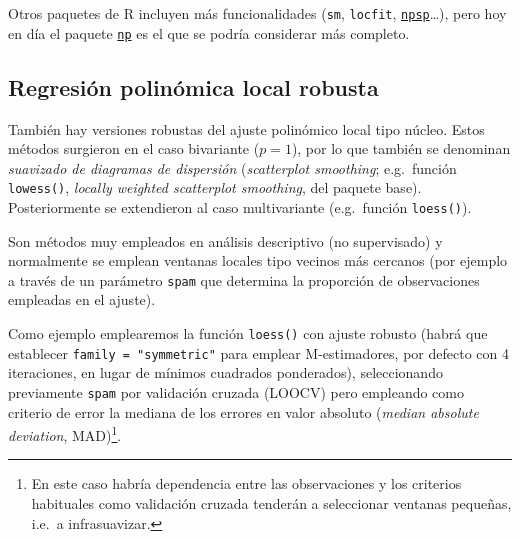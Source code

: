 \documentclass[
]{book}
\theoremstyle{break}
\theoremstyle{definition}
\theoremstyle{definition}
\theoremstyle{definition}
\theoremstyle{remark}
\begin{document}
Otros paquetes de R incluyen más funcionalidades (\texttt{sm}, \texttt{locfit}, \href{https://rubenfcasal.github.io/npsp}{\texttt{npsp}}\ldots), pero hoy en día el paquete \href{https://github.com/JeffreyRacine/R-Package-np}{\texttt{np}} es el que se podría considerar más completo.

\hypertarget{regresiuxf3n-polinuxf3mica-local-robusta}{%
\subsection{Regresión polinómica local robusta}\label{regresiuxf3n-polinuxf3mica-local-robusta}}

También hay versiones robustas del ajuste polinómico local tipo núcleo.
Estos métodos surgieron en el caso bivariante (\(p=1\)), por lo que también se denominan \emph{suavizado de diagramas de dispersión} (\emph{scatterplot smoothing}; e.g.~función \texttt{lowess()}, \emph{locally weighted scatterplot smoothing}, del paquete base).
Posteriormente se extendieron al caso multivariante (e.g.~función \texttt{loess()}).

Son métodos muy empleados en análisis descriptivo (no supervisado) y normalmente se emplean ventanas locales tipo vecinos más cercanos (por ejemplo a través de un parámetro \texttt{spam} que determina la proporción de observaciones empleadas en el ajuste).

Como ejemplo emplearemos la función \texttt{loess()} con ajuste robusto (habrá que establecer \texttt{family\ =\ "symmetric"} para emplear M-estimadores, por defecto con 4 iteraciones, en lugar de mínimos cuadrados ponderados), seleccionando previamente \texttt{spam} por validación cruzada (LOOCV) pero empleando como criterio de error la mediana de los errores en valor absoluto (\emph{median absolute deviation}, MAD)\footnote{En este caso habría dependencia entre las observaciones y los criterios habituales como validación cruzada tenderán a seleccionar ventanas pequeñas, i.e.~a infrasuavizar.}.
\end{document}
